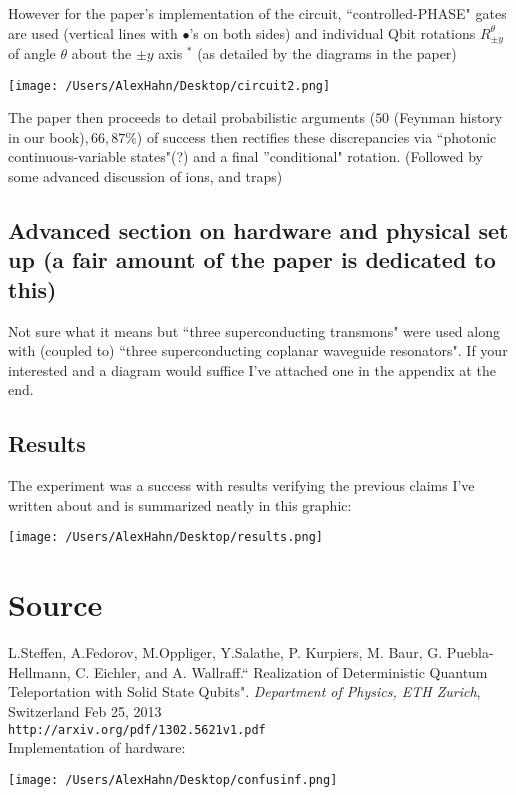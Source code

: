 However for the paper's implementation of the circuit, ``controlled-PHASE"
gates are used (vertical lines with $\bullet$'s on both sides)
and individual Qbit rotations $R_{\pm y}^\theta$ of angle $\theta$ about the
$\pm y$ axis $^*$ (as detailed by the diagrams in the paper)

\begin{center}
\texttt{[image: /Users/AlexHahn/Desktop/circuit2.png]}
\end{center}

The paper then proceeds to detail probabilistic arguments ($50$ (Feynman
history in our book)$,66,87\%$) of
success then rectifies these discrepancies via ``photonic
continuous-variable states"(?) and a final ''conditional" rotation.
(Followed by some advanced discussion of ions, and traps)

\subsection*{Advanced section on hardware and physical set up (a fair
amount of the paper is dedicated to this)}

Not sure what it means but ``three superconducting transmons" were used
along with (coupled to) ``three superconducting coplanar waveguide
resonators". If your interested and a diagram would suffice I've attached one
in the appendix at the end.

\subsection*{Results}
The experiment was a success with results verifying the previous claims I've written about and is summarized neatly in this graphic:

\begin{center}
\texttt{[image: /Users/AlexHahn/Desktop/results.png]}
\end{center}



\section*{Source}

L.Steffen, A.Fedorov, M.Oppliger, Y.Salathe, P. Kurpiers, M. Baur, G.
Puebla-Hellmann, C. Eichler, and A. Wallraff.`` Realization of Deterministic Quantum Teleportation with Solid State Qubits". \textit{ Department of Physics, ETH Zurich}, Switzerland Feb 25, 2013\\

\texttt{http://arxiv.org/pdf/1302.5621v1.pdf}\\



Implementation of hardware:
\begin{center}
\texttt{[image: /Users/AlexHahn/Desktop/confusinf.png]}
\end{center}














